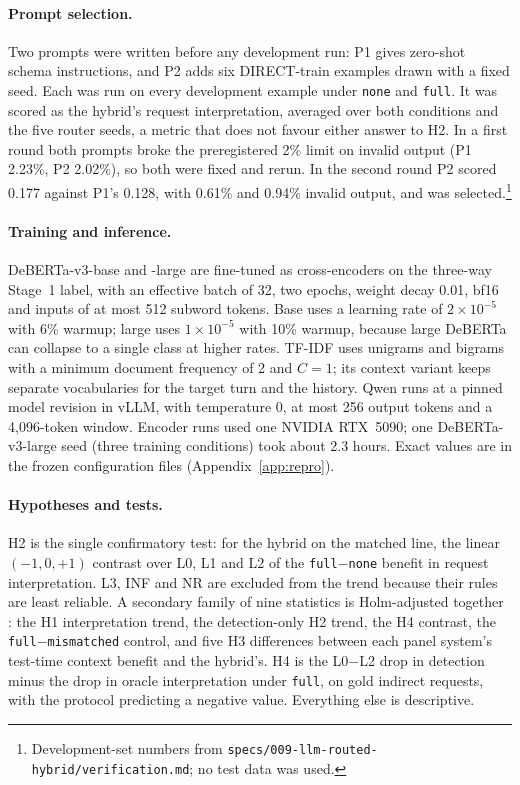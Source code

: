 \documentclass{article}
\begin{document}
\paragraph{Prompt selection.}
Two prompts were written before any development run: P1 gives zero-shot schema instructions,
and P2 adds six DIRECT-train examples drawn with a fixed seed. Each was run on every development
example under \texttt{none} and \texttt{full}. It was scored as the hybrid's request
interpretation, averaged over both conditions and the five router seeds, a metric that does not
favour either answer to H2. In a first round both prompts broke the preregistered 2\% limit on
invalid output (P1 2.23\%, P2 2.02\%), so both were fixed and rerun. In the second round P2
scored 0.177 against P1's 0.128, with 0.61\% and 0.94\% invalid output, and was
selected.\footnote{Development-set numbers from
\texttt{specs/009-llm-routed-hybrid/verification.md}; no test data was used.}

\paragraph{Training and inference.}
DeBERTa-v3-base and -large are fine-tuned as cross-encoders on the three-way Stage~1 label, with
an effective batch of 32, two epochs, weight decay 0.01, bf16 and inputs of at most 512 subword
tokens. Base uses a learning rate of $2\times10^{-5}$ with 6\% warmup; large uses
$1\times10^{-5}$ with 10\% warmup, because large DeBERTa can collapse to a single class at higher
rates. TF-IDF uses unigrams and bigrams with a minimum document frequency of 2 and $C=1$; its
context variant keeps separate vocabularies for the target turn and the history. Qwen runs at a
pinned model revision in vLLM, with temperature 0, at most 256 output tokens and a 4{,}096-token
window. Encoder runs used one NVIDIA RTX~5090; one DeBERTa-v3-large seed (three training
conditions) took about 2.3 hours. Exact values are in the frozen configuration files
(Appendix~\ref{app:repro}).

\paragraph{Hypotheses and tests.}
H2 is the single confirmatory test: for the hybrid on the matched line, the linear
$(-1,0,+1)$ contrast over L0, L1 and L2 of the \texttt{full}$-$\texttt{none} benefit in request
interpretation. L3, INF and NR are excluded from the trend because their rules are least
reliable. A secondary family of nine statistics is Holm-adjusted together
\citep{holm1979}: the H1 interpretation trend, the detection-only H2 trend, the H4 contrast,
the \texttt{full}$-$\texttt{mismatched} control, and five H3 differences between each panel
system's test-time context benefit and the hybrid's. H4 is the L0$-$L2 drop in detection minus
the drop in oracle interpretation under \texttt{full}, on gold indirect requests, with the
protocol predicting a negative value. Everything else is descriptive.
\end{document}
